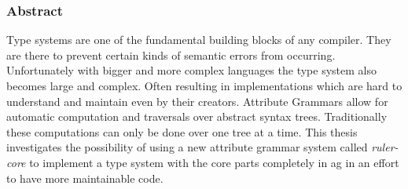 \newpage
\thispagestyle{headings}
\mbox{}

\newpage
\thispagestyle{headings}
\mbox{}

\begin{center} \subsubsection*{Abstract} \end{center}
Type systems are one of the fundamental building blocks of any compiler. They are there to prevent certain kinds of semantic errors from occurring. Unfortunately with bigger and more complex languages the type system also becomes large and complex. Often resulting in implementations which are hard to understand and maintain even by their creators.
Attribute Grammars allow for automatic computation and traversals over abstract syntax trees. Traditionally these computations can only be done over one tree at a time. This thesis investigates the possibility of using a new attribute grammar system called \emph{ruler-core} to implement a type system with the core parts completely in ag in an effort to have more maintainable code.

